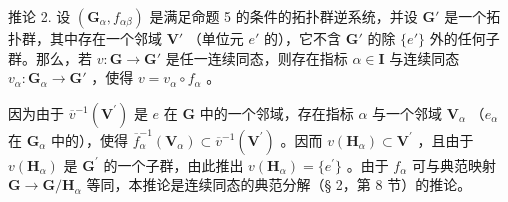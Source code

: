 推论 2. 设 \((\mathbf{G}_{\alpha}, f_{\alpha \beta})\) 是满足命题 5 的条件的拓扑群逆系统，并设 \(\mathbf{G}'\) 是一个拓扑群，其中存在一个邻域 \(\mathbf{V}'\) （单位元 \(e'\) 的），它不含 \(\mathbf{G}'\) 的除 \(\{e'\}\) 外的任何子群。那么，若 \(v: \mathbf{G} \to \mathbf{G}'\) 是任一连续同态，则存在指标 \(\alpha \in \mathbf{I}\) 与连续同态 \(v_{\alpha}: \mathbf{G}_{\alpha} \to \mathbf{G}'\) ，使得 \(v = v_{\alpha} \circ f_{\alpha}\) 。

因为由于 \(\overline{v}^{-1}(\mathbf{V}^{\prime})\) 是 \(e\) 在 \(\mathbf{G}\) 中的一个邻域，存在指标 \(\alpha\) 与一个邻域 \(\mathbf{V}_{\alpha}\) （\(e_{\alpha}\) 在 \(\mathbf{G}_{\alpha}\) 中的），使得 \(\overline{f}_{\alpha}^{-1}(\mathbf{V}_{\alpha}) \subset \overline{v}^{-1}(\mathbf{V}^{\prime})\) 。因而 \(v(\mathbf{H}_{\alpha}) \subset \mathbf{V}^{\prime}\) ，且由于 \(v(\mathbf{H}_{\alpha})\) 是 \(\mathbf{G}^{\prime}\) 的一个子群，由此推出 \(v(\mathbf{H}_{\alpha}) = \{e^{\prime}\}\) 。由于 \(f_{\alpha}\) 可与典范映射 \(\mathbf{G} \to \mathbf{G}/\mathbf{H}_{\alpha}\) 等同，本推论是连续同态的典范分解（§ 2，第 8 节）的推论。

